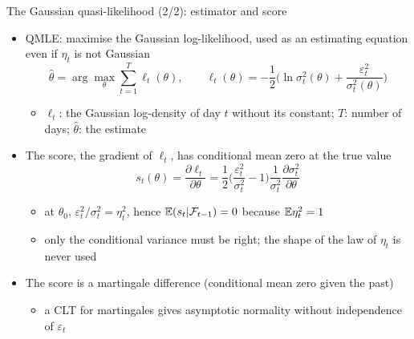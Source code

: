 \begin{frame}{The Gaussian quasi-likelihood (2/2): estimator and score}
\itemsize{\small}
\begin{itemize}
    \item QMLE: maximise the Gaussian log-likelihood, used as an estimating equation even if $\eta_t$ is not Gaussian
    \[ \hat\theta = \arg\max_\theta \sum_{t=1}^T \ell_t(\theta), \qquad \ell_t(\theta) = -\frac12\Big(\ln\sigma^2_t(\theta) + \frac{\varepsilon_t^2}{\sigma^2_t(\theta)}\Big) \]
    \begin{itemize}
        \item $\ell_t$: the Gaussian log-density of day $t$ without its constant; $T$: number of days; $\hat\theta$: the estimate
    \end{itemize}
    \item The score, the gradient of $\ell_t$, has conditional mean zero at the true value
    \[ s_t(\theta) = \frac{\partial\ell_t}{\partial\theta} = \frac12\Big(\frac{\varepsilon_t^2}{\sigma_t^2} - 1\Big)\frac{1}{\sigma^2_t}\frac{\partial\sigma^2_t}{\partial\theta} \]
    \begin{itemize}
        \item at $\theta_0$, $\varepsilon_t^2/\sigma_t^2 = \eta_t^2$, hence $\mathbb{E}(s_t | \mathcal F_{t-1}) = 0$ because $\mathbb{E}\eta_t^2 = 1$
        \item only the conditional variance must be right; the shape of the law of $\eta_t$ is never used
    \end{itemize}
    \item The score is a martingale difference (conditional mean zero given the past)
    \begin{itemize}
        \item a CLT for martingales gives asymptotic normality without independence of $\varepsilon_t$
    \end{itemize}
\end{itemize}
\end{frame}

